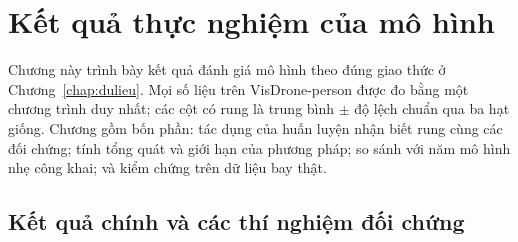 \chapter{Kết quả thực nghiệm của mô hình}
\label{chap:ketqua}

Chương này trình bày kết quả đánh giá mô hình theo đúng giao thức ở Chương~\ref{chap:dulieu}. Mọi số liệu trên VisDrone-person được đo bằng một chương trình duy nhất; các cột có rung là trung bình $\pm$ độ lệch chuẩn qua ba hạt giống. Chương gồm bốn phần: tác dụng của huấn luyện nhận biết rung cùng các đối chứng; tính tổng quát và giới hạn của phương pháp; so sánh với năm mô hình nhẹ công khai; và kiểm chứng trên dữ liệu bay thật.

\section{Kết quả chính và các thí nghiệm đối chứng}
\label{sec:ketquachinh}

